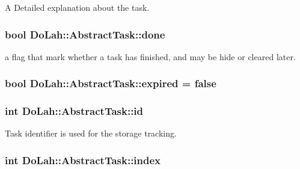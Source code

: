 A Detailed explanation about the task. 

\hypertarget{class_do_lah_1_1_abstract_task_a52d0b20701f38574b77811cd002b65ad}{}
\subsubsection[{done}]{\setlength{\rightskip}{0pt plus 5cm}bool Do\+Lah\+::\+Abstract\+Task\+::done\hspace{0.3cm}{\ttfamily [private]}}\label{class_do_lah_1_1_abstract_task_a52d0b20701f38574b77811cd002b65ad}


a flag that mark whether a task has finished, and may be hide or cleared later. 

\hypertarget{class_do_lah_1_1_abstract_task_afdee8129f634d24d559670e8da94b1a2}{}
\subsubsection[{expired}]{\setlength{\rightskip}{0pt plus 5cm}bool Do\+Lah\+::\+Abstract\+Task\+::expired = false\hspace{0.3cm}{\ttfamily [private]}}\label{class_do_lah_1_1_abstract_task_afdee8129f634d24d559670e8da94b1a2}
\hypertarget{class_do_lah_1_1_abstract_task_a2ad7d227c4ab1ac0768a7633419f0934}{}
\subsubsection[{id}]{\setlength{\rightskip}{0pt plus 5cm}int Do\+Lah\+::\+Abstract\+Task\+::id\hspace{0.3cm}{\ttfamily [private]}}\label{class_do_lah_1_1_abstract_task_a2ad7d227c4ab1ac0768a7633419f0934}


Task identifier is used for the storage tracking. 

\hypertarget{class_do_lah_1_1_abstract_task_a473c5889b75b19da3e81424e3710075e}{}
\subsubsection[{index}]{\setlength{\rightskip}{0pt plus 5cm}int Do\+Lah\+::\+Abstract\+Task\+::index\hspace{0.3cm}{\ttfamily [private]}}\label{class_do_lah_1_1_abstract_task_a473c5889b75b19da3e81424e3710075e}
\hypertarget{class_do_lah_1_1_abstract_task_a0d5e0174ffcd6b8e0f152130ede57fcb}{}
